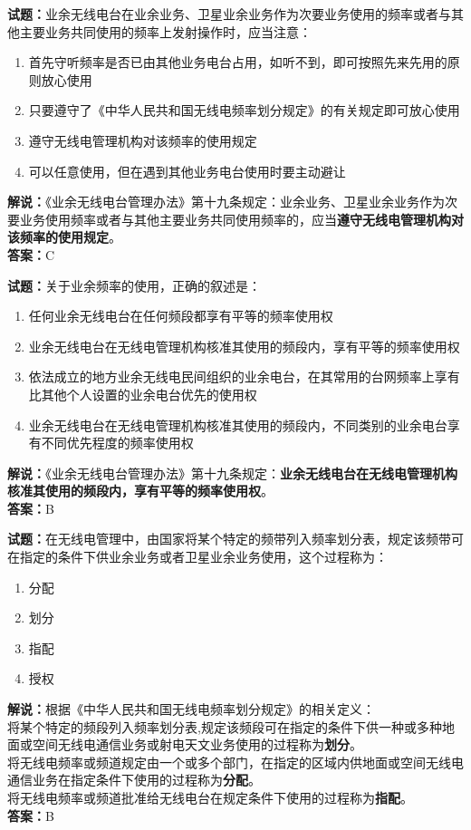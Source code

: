 \documentclass{ctexbook}
\begin{document}
\bigskip


\noindent\textbf{试题：}业余无线电台在业余业务、卫星业余业务作为次要业务使用的频率或者与其他主要业务共同使用的频率上发射操作时，应当注意：
\begin{enumerate}[leftmargin=3em]
\item 首先守听频率是否已由其他业务电台占用，如听不到，即可按照先来先用的原则放心使用
\item 只要遵守了《中华人民共和国无线电频率划分规定》的有关规定即可放心使用
\item 遵守无线电管理机构对该频率的使用规定
\item 可以任意使用，但在遇到其他业务电台使用时要主动避让
\end{enumerate}
\noindent\textbf{解说：}《业余无线电台管理办法》第十九条规定：业余业务、卫星业余业务作为次要业务使用频率或者与其他主要业务共同使用频率的，应当\textbf{遵守无线电管理机构对该频率的使用规定}。\\\noindent\textbf{答案：}C



\bigskip


\noindent\textbf{试题：}关于业余频率的使用，正确的叙述是：
\begin{enumerate}[leftmargin=3em]
\item 任何业余无线电台在任何频段都享有平等的频率使用权
\item 业余无线电台在无线电管理机构核准其使用的频段内，享有平等的频率使用权
\item 依法成立的地方业余无线电民间组织的业余电台，在其常用的台网频率上享有比其他个人设置的业余电台优先的使用权
\item 业余无线电台在无线电管理机构核准其使用的频段内，不同类别的业余电台享有不同优先程度的频率使用权
\end{enumerate}
\noindent\textbf{解说：}《业余无线电台管理办法》第十九条规定：\textbf{业余无线电台在无线电管理机构核准其使用的频段内，享有平等的频率使用权}。\\\noindent\textbf{答案：}B



\bigskip


\noindent\textbf{试题：}在无线电管理中，由国家将某个特定的频带列入频率划分表，规定该频带可在指定的条件下供业余业务或者卫星业余业务使用，这个过程称为：
\begin{enumerate}[leftmargin=3em]
\item 分配
\item 划分
\item 指配
\item 授权
\end{enumerate}
\noindent\textbf{解说：}根据《中华人民共和国无线电频率划分规定》的相关定义：\\将某个特定的频段列入频率划分表,规定该频段可在指定的条件下供一种或多种地面或空间无线电通信业务或射电天文业务使用的过程称为\textbf{划分}。\\将无线电频率或频道规定由一个或多个部门，在指定的区域内供地面或空间无线电通信业务在指定条件下使用的过程称为\textbf{分配}。\\将无线电频率或频道批准给无线电台在规定条件下使用的过程称为\textbf{指配}。\\
\textbf{答案：}B
\end{document}
